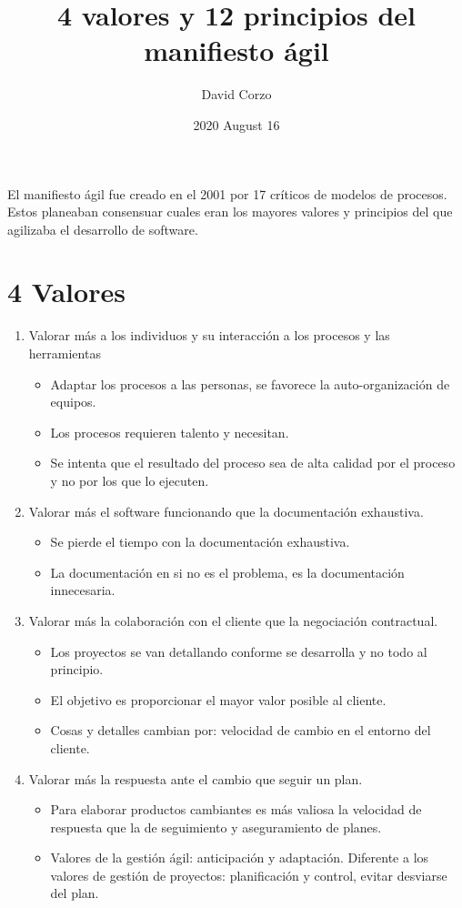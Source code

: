 \documentclass{article}
\title{4 valores y 12 principios del manifiesto ágil}
\date{2020 August 16} %
\author{David Corzo}
\begin{document}
\maketitle

El manifiesto ágil fue creado en el 2001 por 17 críticos de modelos de procesos. Estos planeaban consensuar cuales eran los mayores valores y principios del que agilizaba el desarrollo de software.

\section{4 Valores}
\begin{enumerate}
    \item Valorar más a los individuos y su interacción a los procesos y las herramientas
        \begin{itemize}
            \item Adaptar los procesos a las personas, se favorece la auto-organización de equipos.
            \item Los procesos requieren talento y necesitan.
            \item Se intenta que el resultado del proceso sea de alta calidad por el proceso y no por los que lo ejecuten. 
        \end{itemize}
    \item Valorar más el software funcionando que la documentación exhaustiva.
        \begin{itemize}
            \item Se pierde el tiempo con la documentación exhaustiva.
            \item La documentación en si no es el problema, es la documentación innecesaria. 
        \end{itemize}
    \item Valorar más la colaboración con el cliente que la negociación contractual.
        \begin{itemize}
            \item Los proyectos se van detallando conforme se desarrolla y no todo al principio. 
            \item El objetivo es proporcionar el mayor valor posible al cliente. 
            \item Cosas y detalles cambian por: velocidad de cambio en el entorno del cliente.
        \end{itemize}
    \item Valorar más la respuesta ante el cambio que seguir un plan.
        \begin{itemize}
            \item Para elaborar productos cambiantes es más valiosa la velocidad de respuesta que la de seguimiento y aseguramiento de planes. 
            \item Valores de la gestión ágil: anticipación y adaptación. Diferente a los valores de gestión de proyectos: planificación y control, evitar desviarse del plan. 
        \end{itemize}
\end{enumerate}
\end{document}
